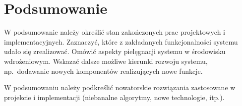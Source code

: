 \chapter{Podsumowanie}
\thispagestyle{chapterBeginStyle}

W podsumowanie należy określić stan zakończonych prac projektowych i implementacyjnych. Zaznaczyć, które z zakładanych funkcjonalności systemu udało się zrealizować. Omówić aspekty pielęgnacji systemu w środowisku wdrożeniowym. Wskazać dalsze możliwe kierunki rozwoju systemu, np.\ dodawanie nowych komponentów realizujących nowe funkcje.

W podsumowaniu należy podkreślić nowatorskie rozwiązania zastosowane w projekcie i implementacji (niebanalne algorytmy, nowe technologie, itp.).



